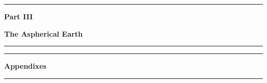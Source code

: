 \documentclass[fleqn,openany]{book}
\begin{document}
\begin{CJK*}{UTF8}{gkai}






\newpage{\pagestyle{empty}\cleardoublepage}
\thispagestyle{empty}
\vspace*{22mm}
\begin{center}
\rule{\linewidth}{0.5mm}
\end{center}
\begin{center}
\huge{\textbf{Part III}}
\end{center}
\begin{center}
\Huge{\textbf{The Aspherical Earth}}
\rule{\linewidth}{0.5mm}
\end{center}
\newpage{\pagestyle{empty}\cleardoublepage}






\newpage{\pagestyle{empty}\cleardoublepage}
\thispagestyle{empty}
\vspace*{27mm}
\begin{center}
\rule{\linewidth}{0.5mm}
\end{center}
\begin{center}
\Huge{\textbf{Appendixes}}
\rule{\linewidth}{0.5mm}
\end{center}
\newpage{\pagestyle{empty}\cleardoublepage}

\appendix
\renewcommand{\thesection}{\Alph{chapter}.\arabic{section}}
\renewcommand{\thesubsection}{\Alph{chapter}.\arabic{section}.\arabic{subsection}}




\renewcommand{\thesection}{\arabic{chapter}.\arabic{section}}
\renewcommand{\thesubsection}{\arabic{chapter}.\arabic{section}.\arabic{subsection}}

\newpage{\pagestyle{empty}\cleardoublepage}
\small

\normalsize

\newpage{\pagestyle{empty}\cleardoublepage}
\small
\printindex
\normalsize

\end{CJK*}
\end{document}
